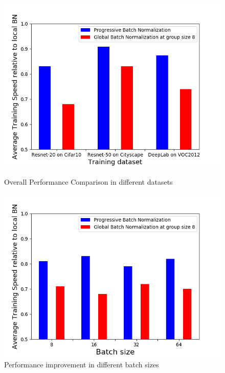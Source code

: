 \documentclass{llncs}
\begin{document}
\begin{figure}[h]
\begin{minipage}[t]{0.45\linewidth}
\centering
\includegraphics[width=1\linewidth]{figure/pbn-speed-improvement.png}
    \caption{Overall Performance Comparison in different datasets}
    \label{fig:pbn-speed-improve}
\end{minipage}
\hfill
\begin{minipage}[t]{0.45\linewidth}
\centering
\includegraphics[width=1\textwidth]{figure/pbn-cifar10.png}
\caption{Performance improvement in different batch sizes}
\label{fig:cifar10-PBN}
\end{minipage}
\end{figure}
\end{document}
